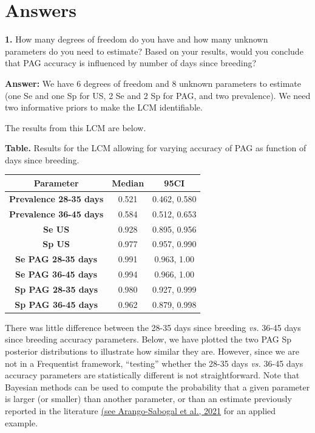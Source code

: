 \documentclass[
]{book}
\begin{document}
\section{Answers}\label{answers-4}

\textbf{1.} How many degrees of freedom do you have and how many unknown parameters do you need to estimate? Based on your results, would you conclude that PAG accuracy is influenced by number of days since breeding?

\textbf{Answer:} We have 6 degrees of freedom and 8 unknown parameters to estimate (one Se and one Sp for US, 2 Se and 2 Sp for PAG, and two prevalence). We need two informative priors to make the LCM identifiable.

The results from this LCM are below.

\textbf{Table.} Results for the LCM allowing for varying accuracy of PAG as function of days since breeding.

\begin{longtable}[]{@{}ccc@{}}
\toprule\noalign{}
\textbf{Parameter} & \textbf{Median} & \textbf{95CI} \\
\midrule\noalign{}
\endhead
\bottomrule\noalign{}
\endlastfoot
\textbf{Prevalence 28-35 days} & 0.521 & 0.462, 0.580 \\
\textbf{Prevalence 36-45 days} & 0.584 & 0.512, 0.653 \\
\textbf{Se US} & 0.928 & 0.895, 0.956 \\
\textbf{Sp US} & 0.977 & 0.957, 0.990 \\
\textbf{Se PAG 28-35 days} & 0.991 & 0.963, 1.00 \\
\textbf{Se PAG 36-45 days} & 0.994 & 0.966, 1.00 \\
\textbf{Sp PAG 28-35 days} & 0.980 & 0.927, 0.999 \\
\textbf{Sp PAG 36-45 days} & 0.962 & 0.879, 0.998 \\
\end{longtable}

There was little difference between the 28-35 days since breeding \emph{vs.} 36-45 days since breeding accuracy parameters. Below, we have plotted the two PAG Sp posterior distributions to illustrate how similar they are. However, since we are not in a Frequentist framework, ``testing'' whether the 28-35 days \emph{vs.} 36-45 days accuracy parameters are statistically different is not straightforward. Note that Bayesian methods can be used to compute the probability that a given parameter is larger (or smaller) than another parameter, or than an estimate previously reported in the literature \href{https://doi.org/10.1016/j.prevetmed.2021.105510}{(see Arango-Sabogal et al., 2021} for an applied example.
\end{document}
